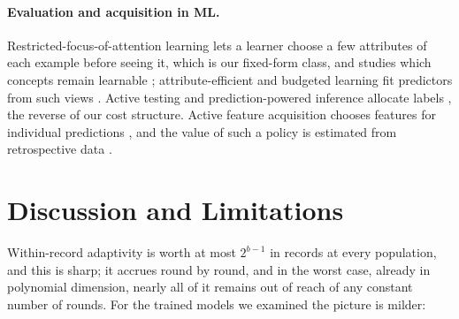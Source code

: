 \documentclass{article}
\begin{document}
\paragraph{Evaluation and acquisition in ML.} Restricted-focus-of-attention learning lets a learner choose a few attributes of each example before seeing it, which is our fixed-form class, and studies which concepts remain learnable \citep{bendavid1998}; attribute-efficient and budgeted learning fit predictors from such views \citep{cesa2011,hazan2012,lizotte2003,kapoor2005}. Active testing and prediction-powered inference allocate labels \citep{kossen2021,zrnic2024,angelopoulos2023}, the reverse of our cost structure. Active feature acquisition chooses features for individual predictions \citep{trapeznikov2013,nan2017,covert2023}, and the value of such a policy is estimated from retrospective data \citep{vonkleist2025}.

\section{Discussion and Limitations}\label{sec:discussion}
Within-record adaptivity is worth at most $2^{b-1}$ in records at every population, and this is sharp; it accrues round by round, and in the worst case, already in polynomial dimension, nearly all of it remains out of reach of any constant number of rounds. For the trained models we examined the picture is milder: \nDiscussionSentence
\end{document}
